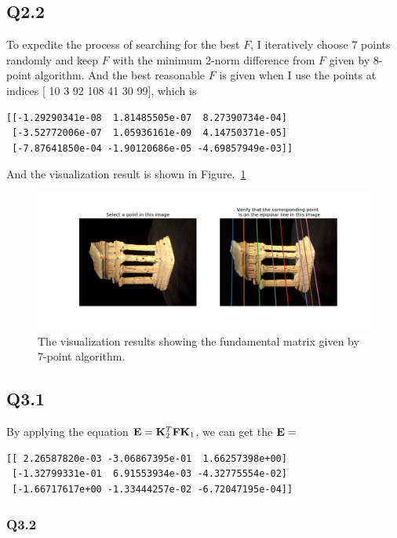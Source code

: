 \documentclass[11pt]{article}
\begin{document}
\newpage

\subsection*{Q2.2}

To expedite the process of searching for the best $F$, I iteratively choose 7 points randomly and keep $F$ with the minimum 2-norm difference from $F$ given by 8-point algorithm. And the best reasonable $F$ is given when I use the points at indices [ 10   3  92 108  41  30  99], which is

\begin{verbatim}
[[-1.29290341e-08  1.81485505e-07  8.27390734e-04]
 [-3.52772006e-07  1.05936161e-09  4.14750371e-05]
 [-7.87641850e-04 -1.90120686e-05 -4.69857949e-03]]
\end{verbatim}

And the visualization result is shown in Figure.~\ref{fig:q2.2}

\begin{figure}[h!]
    \centering
    \includegraphics[width=.8\linewidth]{../results/q2_2.png}
    \caption{The visualization results showing the fundamental matrix given by 7-point algorithm. }
    \label{fig:q2.2}
\end{figure}

\newpage

\subsection*{Q3.1}

By applying the equation $\mathbf{E}=\mathbf{K}_2^T \mathbf{F} \mathbf{K}_1$, we can get the $\mathbf{E}=$

\begin{verbatim}
[[ 2.26587820e-03 -3.06867395e-01  1.66257398e+00]
 [-1.32799331e-01  6.91553934e-03 -4.32775554e-02]
 [-1.66717617e+00 -1.33444257e-02 -6.72047195e-04]]
\end{verbatim}

\newpage

\subsubsection*{Q3.2}
\end{document}
